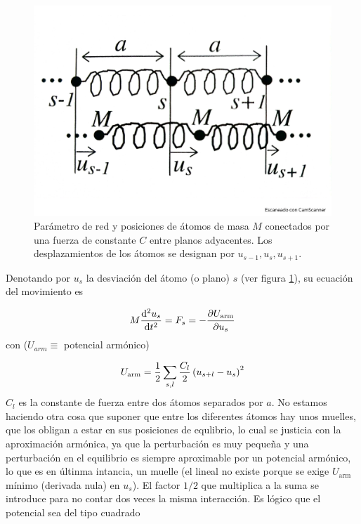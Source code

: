 \begin{figure}[h!] \centering
    \includegraphics[scale=0.35]{Cuerpo/Ch_04/Fotos libro 1.pdf}
    \caption{Parámetro de red y posiciones de átomos de masa $M$ conectados por una fuerza de constante $C$ entre planos adyacentes. Los desplazamientos de los átomos se designan por $u_{s-1},u_{s},u_{s+1}$.}
    \label{Fig:04-01}
\end{figure}    

Denotando por $u_s$ la desviación del átomo (o plano) $s$ (ver figura \ref{Fig:04-01}), su ecuación del movimiento es

\begin{equation}
	M \frac{\mathrm{d} ^2 u_s}{\mathrm{d} t^2} = F_s = - \frac{\partial U_{\text{arm}}}{\partial u_s} \label{Ec:04-01-02}
\end{equation}
con ($U_{arm} \equiv$ potencial armónico)

\begin{equation}
	U_{\text{arm}} = \frac{1}{2} \sum_{s,l} \frac{C_l}{2} \left( u_{s+l}-u_s \right)^2
\end{equation}
$C_l$ es la constante de fuerza entre dos átomos separados por $a$. No estamos haciendo otra cosa que suponer que entre los diferentes átomos hay unos muelles,  que los obligan a estar en sus posiciones de equlibrio, lo cual se justicia con la aproximación armónica, ya que la perturbación es muy pequeña y una perturbación en el equilibrio es siempre aproximable por un potencial armónico, lo que es en últinma intancia, un muelle (el lineal no existe porque se exige $U_{\text{arm}}$ mínimo (derivada nula) en $u_s$). El factor $1/2$ que multiplica a la suma se introduce para no contar dos veces la misma interacción. Es lógico que el potencial sea del tipo cuadrado 

